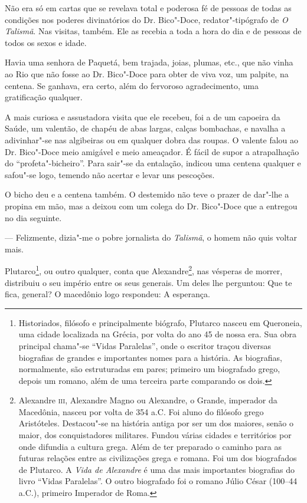 Não era só em cartas que se revelava total e poderosa fé de pessoas de
todas as condições nos poderes divinatórios do Dr. Bico"-Doce,
redator"-tipógrafo de \emph{O Talismã}. Nas visitas, também. Ele as
recebia a toda a hora do dia e de pessoas de todos os sexos e idade.

Havia uma senhora de Paquetá, bem trajada, joias, plumas, etc., que não
vinha ao Rio que não fosse ao Dr. Bico"-Doce para obter de viva voz, um
palpite, na centena. Se ganhava, era certo, além do fervoroso
agradecimento, uma gratificação qualquer.

A mais curiosa e assustadora visita que ele recebeu, foi a de um
capoeira da Saúde, um valentão, de chapéu de abas largas, calças
bombachas, e navalha a adivinhar"-se nas algibeiras ou em qualquer dobra
das roupas. O valente falou ao Dr. Bico"-Doce meio amigável e meio
ameaçador. É fácil de supor a atrapalhação do ``profeta"-bicheiro''. Para
sair"-se da entalação, indicou uma centena qualquer e safou"-se logo,
temendo não acertar e levar uns pescoções.

O bicho deu e a centena também. O destemido não teve o prazer de dar"-lhe
a propina em mão, mas a deixou com um colega do Dr. Bico"-Doce que a
entregou no dia seguinte.

--- Felizmente, dizia"-me o pobre jornalista do \emph{Talismã}, o homem
não quis voltar mais.

Plutarco\footnote{Historiados, filósofo e principalmente biógrafo,
  Plutarco nasceu em Queroneia, uma cidade localizada na Grécia, por
  volta do ano 45 de nossa era. Sua obra principal chama"-se ``Vidas
  Paralelas'', onde o escritor traçou diversas biografias de grandes e
  importantes nomes para a história. As biografias, normalmente, são
  estruturadas em pares; primeiro um biografado grego, depois um romano,
  além de uma terceira parte comparando os dois.}, ou outro qualquer,
conta que Alexandre\footnote{Alexandre \textsc{iii}, Alexandre Magno ou
  Alexandre, o Grande, imperador da Macedônia, nasceu por volta de 354
  a.C. Foi aluno do filósofo grego Aristóteles. Destacou"-se na história
  antiga por ser um dos maiores, senão o maior, dos conquistadores
  militares. Fundou várias cidades e territórios por onde difundia a
  cultura grega. Além de ter preparado o caminho para as futuras
  relações entre as civilizações grega e romana. Foi um dos biografados
  de Plutarco. A \emph{Vida de Alexandre} é uma das mais importantes
  biografias do livro ``Vidas Paralelas''. O outro biografado foi o
  romano Júlio César (100--44 a.C.), primeiro Imperador de
  Roma.}, nas vésperas de morrer, distribuiu o seu império entre os seus
generais. Um deles lhe perguntou: Que te fica, general? O macedônio logo
respondeu: A esperança.

